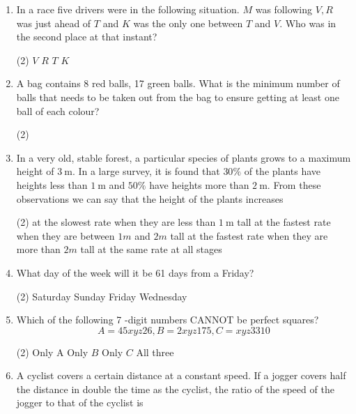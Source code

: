 \begin{enumerate}
 \begin{tasks}(2)
	\task[\textbf{a.}]Region $A$ uses maximum water per kg of rice
	\task[\textbf{b.}] Average water consumption of the four regions is
	$37.5$ lakh liters
	\task[\textbf{c.}] Region $D$ uses thrice the amount of water used by region $A$ per $\mathrm{kg}$ of rice.
	\task[\textbf{d.}]  Region $B$ uses 20 lakh litres of less water than region $A$
\end{tasks}	
\item  In a race five drivers were in the following situation. $M$ was following $V, R$ was just ahead of $T$ and $K$ was the only one between $T$ and $V$. Who was in the second place at that instant?
	 \begin{tasks}(2)
		\task[\textbf{a.}]$V$
		\task[\textbf{b.}]$R$
		\task[\textbf{c.}]$T$
		\task[\textbf{d.}]$K$ 
	\end{tasks}
\item  A bag contains 8 red balls, 17 green balls. What is the minimum number of balls that needs to be taken out from the bag to ensure getting at least one ball of each colour?
	 \begin{tasks}(2)
	\end{tasks}
\item  In a very old, stable forest, a particular species of plants grows to a maximum height of $3 \mathrm{~m}$. In a large survey, it is found that $30 \%$ of the plants have heights less than $1 \mathrm{~m}$ and $50 \%$ have heights more than $2 \mathrm{~m}$. From these observations we can say that the height of the plants increases
	 \begin{tasks}(2)
		\task[\textbf{a.}] at the slowest rate when they are less than $1 \mathrm{~m}$ tall
		\task[\textbf{b.}]at the fastest rate when they are between $1 m$ and $2 m$ tall
		\task[\textbf{c.}]at the fastest rate when they are more than $2 m$ tall
		\task[\textbf{d.}]  at the same rate at all stages
	\end{tasks}
\item  What day of the week will it be 61 days from a Friday?
	 \begin{tasks}(2)
		\task[\textbf{a.}]Saturday
		\task[\textbf{b.}]Sunday
		\task[\textbf{c.}]Friday
		\task[\textbf{d.}] Wednesday
	\end{tasks}
\item  Which of the following 7 -digit numbers CANNOT be perfect squares?
	$$
	A=45 x y z 26, B=2 x y z 175, C=x y z 3310
	$$
	 \begin{tasks}(2)
		\task[\textbf{a.}] Only A
		\task[\textbf{b.}]Only $B$
		\task[\textbf{c.}]Only $C$
		\task[\textbf{d.}] All three
	\end{tasks}
\item  A cyclist covers a certain distance at a constant speed. If a jogger covers half the distance in double the time as the cyclist, the ratio of the speed of the jogger to that of the cyclist is
	

\end{enumerate}

